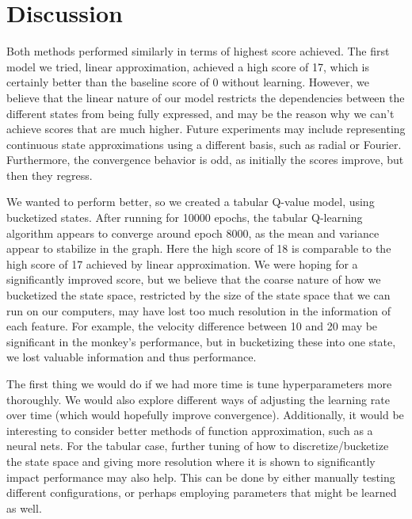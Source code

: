 \documentclass[11pt]{article}
\begin{document}
\section{Discussion}

Both methods performed similarly in terms of highest score achieved. The first model we tried, linear approximation, achieved a high score of 17, which is certainly better than the baseline score of 0 without learning. However, we believe that the linear nature of our model restricts the dependencies between the different states from being fully expressed, and may be the reason why we can't achieve scores that are much higher. Future experiments may include representing continuous state approximations using a different basis, such as radial or Fourier. Furthermore, the convergence behavior is odd, as initially the scores improve, but then they regress.

We wanted to perform better, so we created a tabular Q-value model, using bucketized states. After running for 10000 epochs, the tabular Q-learning algorithm appears to converge around epoch 8000, as the mean and variance appear to stabilize in the graph. Here the high score of 18 is comparable to the high score of 17 achieved by linear approximation. We were hoping for a significantly improved score, but we believe that the coarse nature of how we bucketized the state space, restricted by the size of the state space that we can run on our computers, may have lost too much resolution in the information of each feature. For example, the velocity difference between 10 and 20 may be significant in the monkey's performance, but in bucketizing these into one state, we lost valuable information and thus performance.

The first thing we would do if we had more time is tune hyperparameters more thoroughly. We would also explore different ways of adjusting the learning rate over time (which would hopefully improve convergence). Additionally, it would be interesting to consider better methods of function approximation, such as a neural nets. For the tabular case, further tuning of how to discretize/bucketize the state space and giving more resolution where it is shown to significantly impact performance may also help. This can be done by either manually testing different configurations, or perhaps employing parameters that might be learned as well. 

\printbibliography 
\end{document}
